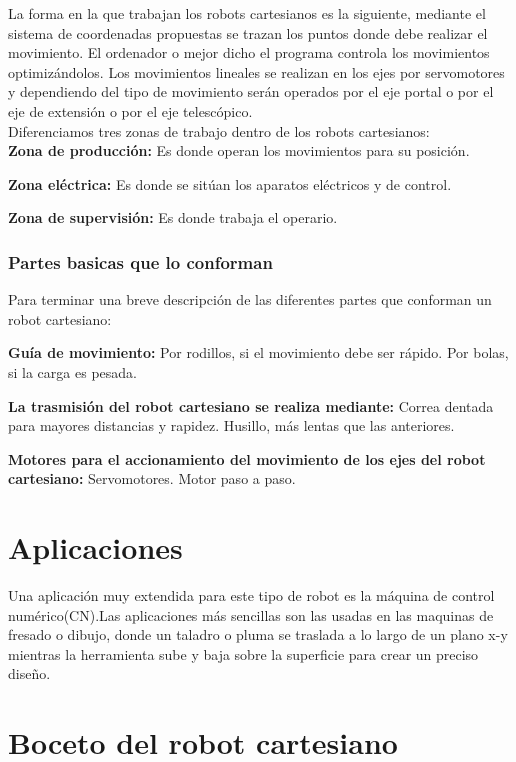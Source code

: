 \documentclass[12pt,a4paper]{report}
\begin{document}
La forma en la que trabajan los robots cartesianos es la siguiente, mediante el sistema de coordenadas propuestas se trazan los puntos donde debe realizar el movimiento. El ordenador o mejor dicho el programa controla los movimientos optimizándolos. Los movimientos lineales se realizan en los ejes por servomotores y dependiendo del tipo de movimiento serán operados por el eje portal o por el eje de extensión o por el eje telescópico.\\

Diferenciamos tres zonas de trabajo dentro de los robots cartesianos:\\

\textbf{Zona de producción:} Es donde operan los movimientos para su posición.

\textbf{Zona eléctrica:} Es donde se sitúan los aparatos eléctricos y de control.

\textbf{Zona de supervisión:} Es donde trabaja el operario.

\subsubsection{Partes basicas que lo conforman}
Para terminar una breve descripción de las diferentes partes que conforman un robot cartesiano:

\textbf{Guía de movimiento:}
Por rodillos, si el movimiento debe ser rápido.
Por bolas, si la carga es pesada.

\textbf{La trasmisión del robot cartesiano se realiza mediante:}
Correa dentada para mayores distancias y rapidez.
Husillo, más lentas que las anteriores.

\textbf{Motores para el accionamiento del movimiento de los ejes del robot cartesiano:}
Servomotores.
Motor paso a paso.

\section{Aplicaciones}

Una aplicación muy extendida para este tipo de robot es la máquina de control numérico(CN).Las aplicaciones más sencillas son las usadas en las maquinas de fresado o dibujo, donde un taladro o pluma se traslada a lo largo de un plano x-y mientras la herramienta sube y baja sobre la superficie para crear un preciso diseño.

\section{Boceto del robot cartesiano}
\end{document}
